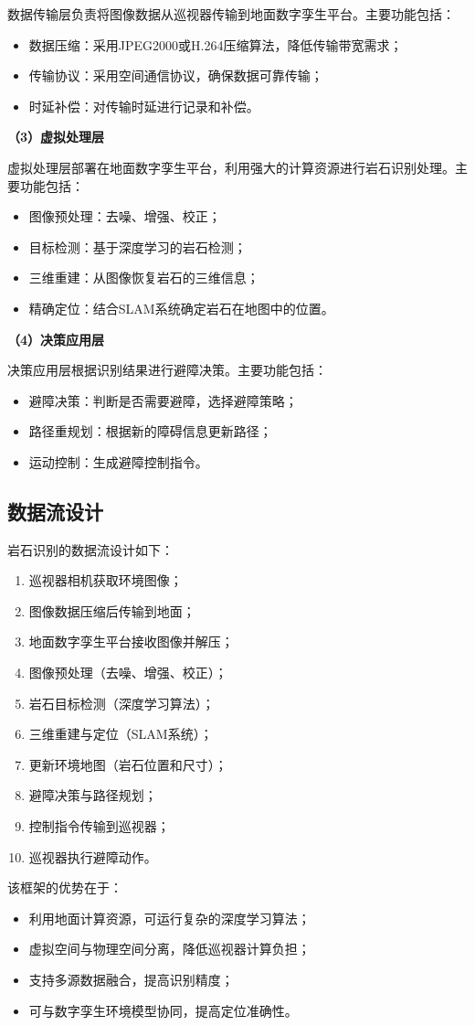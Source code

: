 数据传输层负责将图像数据从巡视器传输到地面数字孪生平台。主要功能包括：
\begin{itemize}
    \item 数据压缩：采用JPEG2000或H.264压缩算法，降低传输带宽需求；
    \item 传输协议：采用空间通信协议，确保数据可靠传输；
    \item 时延补偿：对传输时延进行记录和补偿。
\end{itemize}

\textbf{（3）虚拟处理层}

虚拟处理层部署在地面数字孪生平台，利用强大的计算资源进行岩石识别处理。主要功能包括：
\begin{itemize}
    \item 图像预处理：去噪、增强、校正；
    \item 目标检测：基于深度学习的岩石检测；
    \item 三维重建：从图像恢复岩石的三维信息；
    \item 精确定位：结合SLAM系统确定岩石在地图中的位置。
\end{itemize}

\textbf{（4）决策应用层}

决策应用层根据识别结果进行避障决策。主要功能包括：
\begin{itemize}
    \item 避障决策：判断是否需要避障，选择避障策略；
    \item 路径重规划：根据新的障碍信息更新路径；
    \item 运动控制：生成避障控制指令。
\end{itemize}

\subsection{数据流设计}
\label{subsec:data_flow}

岩石识别的数据流设计如下：

\begin{enumerate}
    \item 巡视器相机获取环境图像；
    \item 图像数据压缩后传输到地面；
    \item 地面数字孪生平台接收图像并解压；
    \item 图像预处理（去噪、增强、校正）；
    \item 岩石目标检测（深度学习算法）；
    \item 三维重建与定位（SLAM系统）；
    \item 更新环境地图（岩石位置和尺寸）；
    \item 避障决策与路径规划；
    \item 控制指令传输到巡视器；
    \item 巡视器执行避障动作。
\end{enumerate}

该框架的优势在于：
\begin{itemize}
    \item 利用地面计算资源，可运行复杂的深度学习算法；
    \item 虚拟空间与物理空间分离，降低巡视器计算负担；
    \item 支持多源数据融合，提高识别精度；
    \item 可与数字孪生环境模型协同，提高定位准确性。
\end{itemize}
